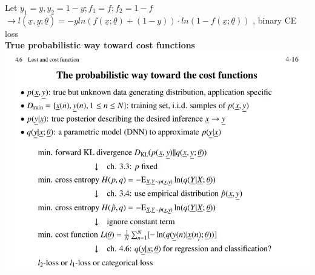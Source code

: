 Let $  y_1 = y, y_2 = 1 - y ; f_1 = f ; f_2 = 1-f $ \\
$ \rightarrow l(\underline{x} , \underline{y} ; \underline{\theta}) = - y ln(f(\underline{x}; \underline{\theta}) + (1-y)) \cdot ln(1-f(\underline{x}; \underline{\theta})) $ , binary CE loss \\
\textbf{True probabilistic way toward cost functions}\\
\includegraphics[width=\linewidth]{Images/ProbabalisticWayCostFunction.png}\\
